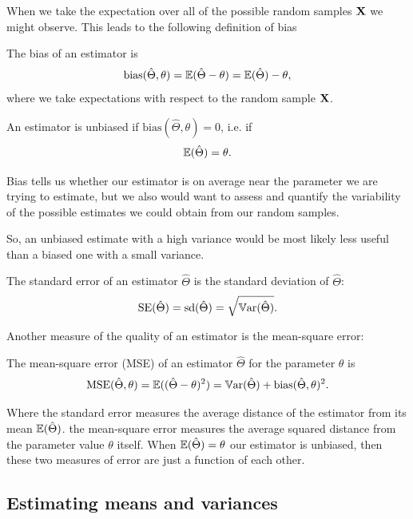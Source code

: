 \documentclass[10pt, a4paper]{article}
\begin{document}
When we take the expectation over all of the possible random samples $\mathbf{X}$ we might observe.
This leads to the following definition of bias
\begin{definition}
    The bias of an estimator is
    \[
    \mathrm{bias}(\hat{\Theta}, \theta) = \mathbb{E}(\hat{\Theta} - \theta) = \mathbb{E}(\hat{\Theta}) - \theta,
    \]
    where we take expectations with respect to the random sample $\mathbf{X}$.

    An estimator is unbiased if $\mathrm{bias}(\hat{\Theta}, \theta) = 0$,
    i.e. if
    \[
    \mathbb{E}(\hat{\Theta}) = \theta.
    \]
\end{definition}

Bias tells us whether our estimator is on average near the parameter we are trying to estimate,
but we also would want to assess and quantify the variability of the possible estimates we could obtain from our random samples.

So,
an unbiased estimate with a high variance would be most likely less useful than a biased one with a small variance.
\begin{definition}
    The standard error of an estimator $\hat{\Theta}$ is the standard deviation of $\hat{\Theta}$:
    \[
    \mathrm{SE}(\hat{\Theta}) = \mathrm{sd}(\hat{\Theta}) = \sqrt{\mathbb{V}\mathrm{ar}(\hat{\Theta})}.
    \]
\end{definition}

Another measure of the quality of an estimator is the mean-square error:
\begin{definition}
    The mean-square error
    (MSE)
    of an estimator $\hat{\Theta}$ for the parameter $\theta$ is
    \[
    \mathrm{MSE}(\hat{\Theta}, \theta) = \mathbb{E}((\hat{\Theta} - \theta) ^ 2) = \mathbb{V}\mathrm{ar}(\hat{\Theta}) + \mathrm{bias}(\hat{\Theta}, \theta) ^ 2.
    \]
\end{definition}

Where the standard error measures the average distance of the estimator from its mean $\mathbb{E}(\hat{\Theta})$.
the mean-square error measures the average squared distance from the parameter value $\theta$ itself.
When $\mathbb{E}(\hat{\Theta}) = \theta$ our estimator is unbiased,
then these two measures of error are just a function of each other.

\subsection{Estimating means and variances}
\end{document}
